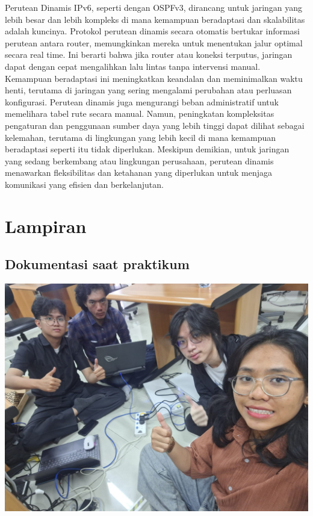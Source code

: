 Perutean Dinamis IPv6, seperti dengan OSPFv3, dirancang untuk 
jaringan yang lebih besar dan lebih kompleks di mana kemampuan 
beradaptasi dan skalabilitas adalah kuncinya. Protokol perutean 
dinamis secara otomatis bertukar informasi perutean antara 
router, memungkinkan mereka untuk menentukan jalur optimal 
secara real time. Ini berarti bahwa jika router atau koneksi 
terputus, jaringan dapat dengan cepat mengalihkan lalu lintas 
tanpa intervensi manual. Kemampuan beradaptasi ini meningkatkan 
keandalan dan meminimalkan waktu henti, terutama di jaringan 
yang sering mengalami perubahan atau perluasan konfigurasi. 
Perutean dinamis juga mengurangi beban administratif untuk 
memelihara tabel rute secara manual. Namun, peningkatan 
kompleksitas pengaturan dan penggunaan sumber daya yang lebih 
tinggi dapat dilihat sebagai kelemahan, terutama di lingkungan 
yang lebih kecil di mana kemampuan beradaptasi seperti itu tidak 
diperlukan. Meskipun demikian, untuk jaringan yang sedang 
berkembang atau lingkungan perusahaan, perutean dinamis 
menawarkan fleksibilitas dan ketahanan yang diperlukan untuk 
menjaga komunikasi yang efisien dan berkelanjutan.
\section{Lampiran}
\subsection{Dokumentasi saat praktikum}
\includegraphics[scale=0.3]{P1/img/18.jpg}